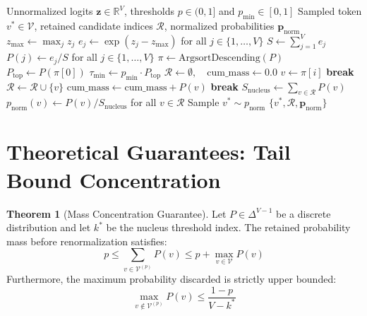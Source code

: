 \documentclass[11pt,a4paper]{article}
\theoremstyle{definition}
\newtheorem{theorem}{\textbf{Theorem}}[section]
\begin{document}
\begin{algorithm}[H]
\caption{Nucleus (Top-$p$) and Min-$p$ Sampling Pipeline}
\label{alg:nucleus_sampling}
\begin{algorithmic}[1]
\Require Unnormalized logits $\mathbf{z} \in \mathbb{R}^V$, thresholds $p \in (0, 1]$ and $p_{\min} \in [0, 1]$
\Ensure Sampled token $v^* \in \mathcal{V}$, retained candidate indices $\mathcal{R}$, normalized probabilities $\mathbf{p}_{\text{norm}}$
\State $z_{\max} \gets \max_{j} z_j$
\State $e_j \gets \exp(z_j - z_{\max})$ for all $j \in \{1, \dots, V\}$
\State $S \gets \sum_{j=1}^V e_j$
\State $P(j) \gets e_j / S$ for all $j \in \{1, \dots, V\}$
\State $\pi \gets \text{ArgsortDescending}(P)$ 
\State $P_{\text{top}} \gets P(\pi[0])$
\State $\tau_{\min} \gets p_{\min} \cdot P_{\text{top}}$
\State $\mathcal{R} \gets \emptyset, \quad \text{cum\_mass} \gets 0.0$
    \State $v \gets \pi[i]$
        \State \textbf{break}
    \EndIf
    \State $\mathcal{R} \gets \mathcal{R} \cup \{v\}$
    \State $\text{cum\_mass} \gets \text{cum\_mass} + P(v)$
        \State \textbf{break}
    \EndIf
\EndFor
\State $S_{\text{nucleus}} \gets \sum_{v \in \mathcal{R}} P(v)$
\State $p_{\text{norm}}(v) \gets P(v) / S_{\text{nucleus}}$ for all $v \in \mathcal{R}$
\State Sample $v^* \sim p_{\text{norm}}$
\State \Return $\{v^*, \mathcal{R}, \mathbf{p}_{\text{norm}}\}$
\end{algorithmic}
\end{algorithm}

\section{Theoretical Guarantees: Tail Bound Concentration}

\begin{theorem}[Mass Concentration Guarantee]
Let $P \in \Delta^{V-1}$ be a discrete distribution and let $k^*$ be the nucleus threshold index. The retained probability mass before renormalization satisfies:
\begin{equation}
p \le \sum_{v \in \mathcal{V}^{(p)}} P(v) \le p + \max_{v \in \mathcal{V}} P(v)
\end{equation}
Furthermore, the maximum probability discarded is strictly upper bounded:
\begin{equation}
\max_{v \notin \mathcal{V}^{(p)}} P(v) \le \frac{1 - p}{V - k^*}
\end{equation}
\end{theorem}
\end{document}
